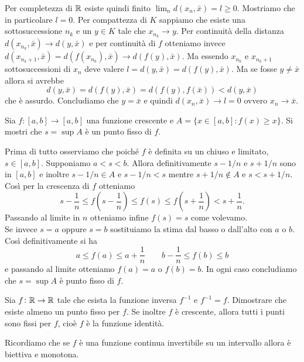 \documentclass[a4paper]{article}\par \usepackage{style}\par
\begin{document}
Per completezza di $ \mathbb{R} $ esiste quindi finito $ \lim_n d(x_n, \bar{x}) = l \geq 0 $. Mostriamo che in particolare $ l = 0 $. Per compattezza di $ K $ sappiamo che esiste una sottosuccessione $ n_k $ e un $ y \in K $ tale che $ x_{n_k} \to y $. Per continuità della distanza $ d(x_{n_k}, \bar{x}) \to d(y, \bar{x}) $ e per continuità di $ f $ otteniamo invece $ d(x_{n_k + 1}, \bar{x}) = d(f(x_{n_k}), \bar{x}) \to d(f(y), \bar{x}) $. Ma essendo $ x_{n_k} $ e $ x_{n_k + 1} $ sottosuccessioni di $ x_n $ deve valere $ l = d(y, \bar{x}) = d(f(y), \bar{x}) $. Ma se fosse $ y \neq \bar{x} $ allora si avrebbe
\begin{equation*}
  d(y, \bar{x}) = d(f(y), \bar{x}) = d(f(y), f(\bar{x})) < d(y, \bar{x})
\end{equation*}
che è assurdo. Concludiamo che $ y = \bar{x} $ e quindi $ d(x_n, \bar{x}) \to l = 0 $ ovvero $ x_n \to \bar{x} $.\par \begin{es}
  Sia $ f \colon [a, b] \to [a, b] $ una funzione crescente e $ A = \{x \in [a, b] : f(x) \geq x\} $. Si mostri che $ s = \sup{A} $ è un punto fisso di $ f $.
\end{es}\par Prima di tutto osserviamo che poiché $ f $ è definita su un chiuso e limitato, $ s \in [a, b] $. Supponiamo $ a < s < b $. Allora definitivamente $ s - 1/n $ e $ s + 1/n $ sono in $ [a, b] $ e inoltre $ s - 1/n \in A $ e $ s - 1/n < s $ mentre $ s + 1/n \notin A $ e $ s < s + 1/n $. Così per la crescenza di $ f $ otteniamo
\begin{equation*}
  s - \frac{1}{n} \leq f\left(s - \frac{1}{n}\right) \leq f(s) \leq f\left(s +\frac{1}{n}\right) < s + \frac{1}{n}.
\end{equation*}
Passando al limite in $ n $ otteniamo infine $ f(s) = s $ come volevamo. \\
Se invece $ s = a $ oppure $ s = b $ sostituiamo la stima dal basso o dall'alto con $ a $ o $ b $. Così definitivamente si ha
\begin{equation*}
  a \leq f(a) \leq a + \frac{1}{n} \qquad b - \frac{1}{n} \leq f(b) \leq b
\end{equation*}
e passando al limite otteniamo $ f(a) = a  $ o $ f(b) = b $. In ogni caso concludiamo che $ s = \sup{A} $ è punto fisso di $ f $.\par \begin{es}
  Sia $ f \colon \mathbb{R} \to \mathbb{R} $ tale che esista la funzione inversa $ f^{-1} $ e $ f^{-1} = f $. Dimostrare che esiste almeno un punto fisso per $ f $. Se inoltre $ f $ è crescente, allora tutti i punti sono fissi per $ f $, cioè $ f $ è la funzione identità.
\end{es}\par Ricordiamo che se $ f $ è una funzione continua invertibile su un intervallo allora è biettiva e monotona. \\
\end{document}
